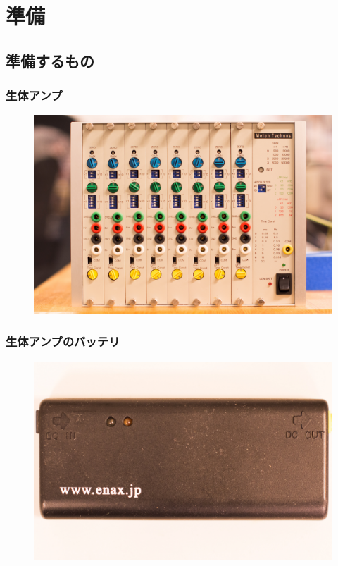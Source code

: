 \documentclass[a4j, twocolumn, openleft, uplatex, dvipdfmx]{jsbook}
\title{\textgt{生体アンプの使い方}}
\author{\textgt{生体通信工学研究室}}
\date{}
\begin{document}
    \maketitle

    \tableofcontents

    \chapter{準備}
    \label{chap:準備}

    \section{準備するもの}
    \label{sec:準備するもの}

        \subsection*{生体アンプ}
            \begin{figure}[H]
                \centering
                \includegraphics[width=0.6\linewidth]{./figure/amp.jpg}
            \end{figure}
        \subsection*{生体アンプのバッテリ}
            \begin{figure}[H]
                \centering
                \includegraphics[width=0.6\linewidth]{./figure/battery.jpg}
            \end{figure}
\end{document}

